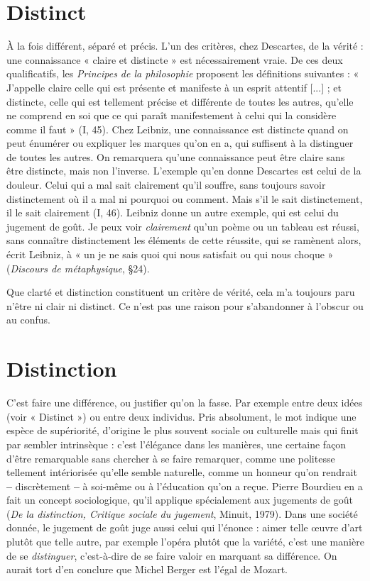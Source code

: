\section{Distinct}
À la fois différent, séparé et précis. L’un des critères, chez Descartes,
de la vérité : une connaissance « claire et distincte » est
nécessairement vraie. De ces deux qualificatifs, les {\it Principes de la philosophie}
proposent les définitions suivantes : « J’appelle claire celle qui est présente et
manifeste à un esprit attentif [...] ; et distincte, celle qui est tellement précise et
différente de toutes les autres, qu’elle ne comprend en soi que ce qui paraît manifestement
à celui qui la considère comme il faut » (I, 45). Chez Leibniz, une
connaissance est distincte quand on peut énumérer ou expliquer les marques
qu'on en a, qui suffisent à la distinguer de toutes les autres. On remarquera
qu’une connaissance peut être claire sans être distincte, mais non l'inverse.
L'exemple qu’en donne Descartes est celui de la douleur. Celui qui a mal sait clairement
qu'il souffre, sans toujours savoir distinctement où il a mal ni pourquoi
ou comment. Mais s’il le sait distinctement, il le sait clairement (I, 46). Leibniz
donne un autre exemple, qui est celui du jugement de goût. Je peux voir {\it clairement}
qu'un poème ou un tableau est réussi, sans connaître distinctement les éléments
de cette réussite, qui se ramènent alors, écrit Leibniz, à « un je ne sais quoi
qui nous satisfait ou qui nous choque » ({\it Discours de métaphysique}, \S 24).

Que clarté et distinction constituent un critère de vérité, cela m’a toujours
paru n'être ni clair ni distinct. Ce n’est pas une raison pour s’abandonner à
l’obscur ou au confus.

\section{Distinction}
C'est faire une différence, ou justifier qu’on la fasse. Par
exemple entre deux idées (voir « Distinct ») ou entre deux
individus. Pris absolument, le mot indique une espèce de supériorité, d’origine
le plus souvent sociale ou culturelle mais qui finit par sembler intrinsèque :
c’est l'élégance dans les manières, une certaine façon d’être remarquable sans
chercher à se faire remarquer, comme une politesse tellement intériorisée
qu’elle semble naturelle, comme un honneur qu’on rendrait {\bf --} discrètement {\bf --} à
soi-même ou à l’éducation qu’on a reçue. Pierre Bourdieu en a fait un concept
sociologique, qu’il applique spécialement aux jugements de goût ({\it De la distinction,
Critique sociale du jugement}, Minuit, 1979). Dans une société donnée, le
jugement de goût juge aussi celui qui l’énonce : aimer telle œuvre d’art plutôt
que telle autre, par exemple l’opéra plutôt que la variété, c’est une manière de
se {\it distinguer}, c’est-à-dire de se faire valoir en marquant sa différence. On aurait
tort d’en conclure que Michel Berger est l’égal de Mozart.

